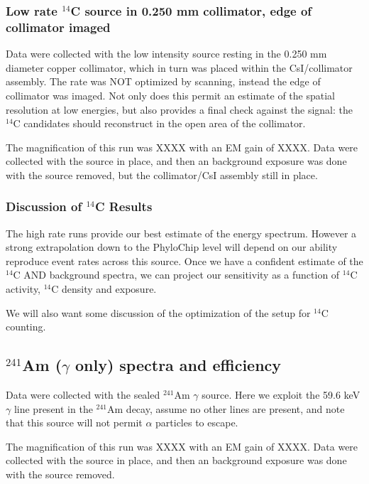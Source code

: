 \documentclass[11pt]{article}
\newcommand{\nuc}[2]{\ensuremath{^{#1}}#2}
\begin{document}
\subsubsection{Low rate \nuc{14}{C} source in 0.250 mm collimator, edge of collimator imaged} 
Data were collected with the low intensity source resting in the 0.250 mm diameter copper collimator, which in turn was placed within the CsI/collimator assembly. The rate was NOT optimized by scanning,
instead the edge of collimator was imaged. Not only does this permit an estimate of the spatial resolution at low energies, but also provides a final check against the signal: the \nuc{14}{C} candidates should reconstruct in the open area of the collimator. 

The magnification of this run was XXXX with an EM gain of XXXX. 
Data were collected with the source in place, and then an background exposure was done with the source removed, but the collimator/CsI assembly still in place. 

 

\subsubsection{Discussion of \nuc{14}{C} Results}
The high rate runs provide our best estimate of the energy spectrum. However a strong extrapolation down to the PhyloChip level will depend on our ability reproduce event rates across this source. 
Once we have a confident estimate of the \nuc{14}{C} AND background spectra, we can project our sensitivity as a function of \nuc{14}{C} activity, \nuc{14}{C} density and exposure.
 
We will also want some discussion of the optimization of the setup for \nuc{14}{C} counting. 





\subsection{\nuc{241}{Am} ($\gamma$ only) spectra and efficiency}
Data were collected with the sealed \nuc{241}{Am} $\gamma$ source. Here we exploit the 59.6 keV $\gamma$ line present in the \nuc{241}{Am} decay, assume no other lines are present, and note that this
source will not permit $\alpha$ particles to escape. 

The magnification of this run was XXXX with an EM gain of XXXX. 
Data were collected with the source in place, and then an background exposure was done with the source removed. 
\end{document}
